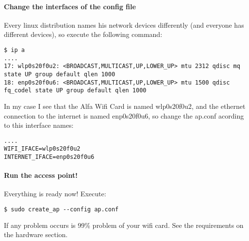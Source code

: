 \paragraph{Change the interfaces of the config
file}\label{change-the-interfaces-of-the-config-file}

Every linux distribution names his network devices differently (and
everyone has different devices), so execute the following command:

\begin{verbatim}
$ ip a
....
17: wlp0s20f0u2: <BROADCAST,MULTICAST,UP,LOWER_UP> mtu 2312 qdisc mq state UP group default qlen 1000
18: enp0s20f0u6: <BROADCAST,MULTICAST,UP,LOWER_UP> mtu 1500 qdisc fq_codel state UP group default qlen 1000

\end{verbatim}

In my case I see that the Alfa Wifi Card is named wlp0s20f0u2, and the
ethernet connection to the internet is named enp0s20f0u6, so change the
ap.conf acording to this interface names:

\begin{verbatim}
....
WIFI_IFACE=wlp0s20f0u2
INTERNET_IFACE=enp0s20f0u6
\end{verbatim}

\paragraph{Run the access point!}\label{run-the-access-point}

Everything is ready now! Execute:

\begin{verbatim}
$ sudo create_ap --config ap.conf
\end{verbatim}

If any problem occurs is 99\% problem of your wifi card. See the
requirements on the hardware section.
